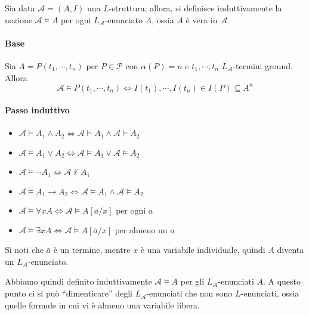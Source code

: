 \begin{defi}
        Sia data $\mathcal{A} = (A,I)$ una $L$-struttura; allora, si definisce 
        induttivamente la nozione $\mathcal{A} \models A$ per ogni 
        $L_{\mathcal{A}}$-enunciato $A$, ossia $A$ è vera in $\mathcal{A}$. 

        \paragraph{Base}
        Sia 
        $A = P(t_1, \cdots, t_n)$ per $P \in \mathcal{P}$ con $\alpha(P) = n$ 
        e $t_1, \cdots, t_n$ $L_{\mathcal{A}}$-termini ground. Allora 
        $$
        \mathcal{A} \models P(t_1, \cdots, t_n) \iff I(t_1), \cdots, I(t_n) \in I(P) \subseteq A^n
        $$
        \paragraph{Passo induttivo}
                \begin{itemize}
                \item $\mathcal{A} \models A_1 \land A_2 \iff \mathcal{A} \models A_1 \land \mathcal{A} \models A_2$
                \item $\mathcal{A} \models A_1 \lor A_2 \iff \mathcal{A} \models A_1 \lor \mathcal{A} \models A_2$
                \item $\mathcal{A} \models \neg A_1  \iff \mathcal{A} \nvdash A_1 $
                \item $\mathcal{A} \models A_1 \rightarrow A_2 \iff \mathcal{A} \models A_1 \land \mathcal{A} \models A_2$
                \item $\mathcal{A} \models\forall x A \iff \mathcal{A} \models A[\bar{a}/x] \text{ per ogni } a$
                \item $\mathcal{A} \models\exists x A \iff \mathcal{A} \models A[\bar{a}/x] \text{ per almeno un } a$
                \end{itemize}
                Si noti che $\bar{a}$ è un termine, mentre $x$ è una variabile 
                individuale, quindi $A$ diventa un $L_{\mathcal{A}}$-enunciato.
\end{defi}

Abbiamo quindi definito induttivamente $\mathcal{A}\models A$ per gli 
$L_{\mathcal{A}}$-enunciati $A$. A questo punto ci si può ``dimenticare'' degli 
$L_{\mathcal{A}}$-enunciati che non sono $L$-enunciati, 
ossia quelle formule in cui vi è almeno una variabile libera.  

